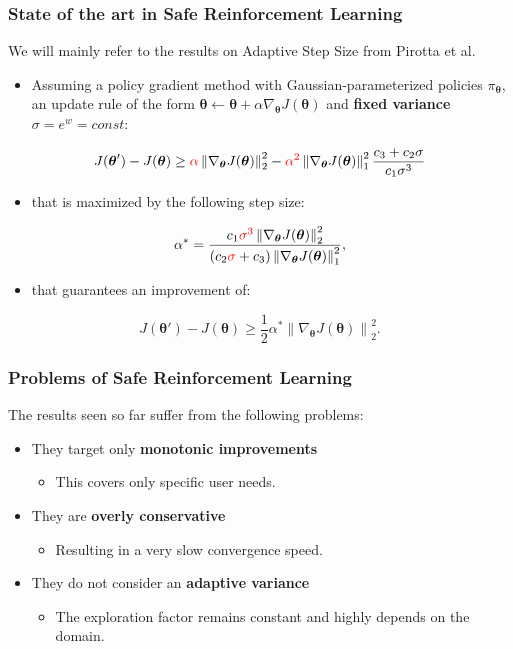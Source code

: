 \documentclass{beamer}
\newcommand{\norm}[2][1]{\left\| #2 \right\|_{#1}}
\newcommand{\vtheta}{{\boldsymbol{\theta}}}
\newcommand*{\gradj}{\nabla_{\vtheta}J(\vtheta)}
\begin{document}
\begin{frame}
\frametitle{State of the art in Safe Reinforcement Learning}
We will mainly refer to the results on Adaptive Step Size from Pirotta et al.

\begin{itemize}
	\item Assuming a policy gradient method with Gaussian-parameterized policies $\pi_{\vtheta}$, an update rule of the form $\vtheta \gets \vtheta + \alpha\gradj$ and \textbf{fixed variance} $\sigma = e^w = const$:
\end{itemize}
\[
J(\vtheta') - J(\vtheta) \geq \textcolor{red}{\alpha} \norm[2]{\nabla_{\vtheta}J(\vtheta)}^2 - \textcolor{red}{\alpha^2} \norm[1]{\nabla_{\vtheta}J(\vtheta)}^2 \frac{c_3 + c_2 \sigma }{c_1 \sigma^3}
\]
\begin{itemize}
	\item that is maximized by the following step size: 
\end{itemize}
	\[
\alpha^* =  \frac{c_1 \textcolor{red}{\sigma^3} \norm[2]{\gradj}^2}{\left(c_2 \textcolor{red}{\sigma} + c_3 \right) \norm[1]{\gradj}^2},
\]
\begin{itemize}
\item that guarantees an improvement of:
\end{itemize}
\[
J(\vtheta') - J(\vtheta) \geq \frac{1}{2}\alpha^* \norm[2]{\gradj}^2.
\]



\end{frame}


\begin{frame}
\frametitle{Problems of Safe Reinforcement Learning}

The results seen so far suffer from the following problems:
\begin{itemize}

\item They target only \textbf{monotonic improvements}
\begin{itemize}
\item This covers only specific user needs.
\end{itemize}

\item They are \textbf{overly conservative}
\begin{itemize}
\item Resulting in a very slow convergence speed.
\end{itemize}

\item They do not consider an \textbf{adaptive variance}
\begin{itemize}
\item The exploration factor remains constant and highly depends on the domain.
\end{itemize}

\end{itemize}


\end{frame}
\end{document}
